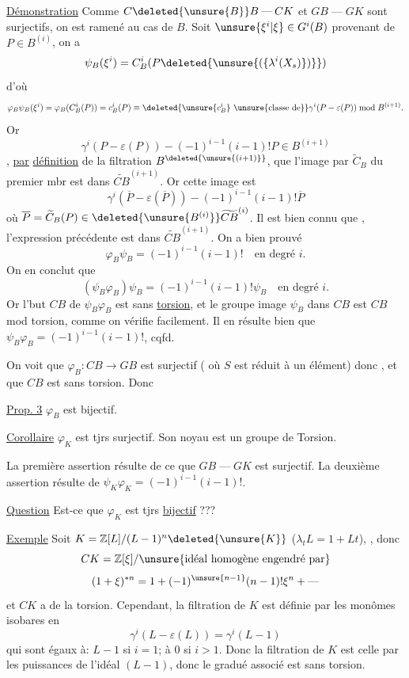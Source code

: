 \uline{Démonstration} Comme $C\deleted{\unsure{B}}B\mathbin{\text{---}}CK$ et $GB\mathbin{\text{---}}GK$ sont surjectifs, on est ramené au cas de $B$.
Soit $\unsure{\xi^i|\xi}\in G^i(B)$ provenant de $P\in B^{(i)}$, on a
\[
\psi_B(\xi^i)=C_B^i(P\deleted{\unsure{(\{\lambda^i(X_s)\})}})
\]
d'où
\[
\varphi_B\psi_B(\xi^i)=\varphi_B(C_B^i(P))=c_B^i(P)
\equiv\deleted{\unsure{c_B^i}\ \text{\unsure{classe de}}}\gamma^i(P-\varepsilon(P))\bmod B^{(i+1)}.
\]
Or 
\[
\gamma^i(P-\varepsilon(P))-(-1)^{i-1}(i-1)!P\in B^{(i+1)}
\]
, \uline{par} \uline{définition} de la filtration $B^{\deleted{\unsure{(i+1)}}}$, que l'image par $\widetilde C_B$ du premier mbr est dans $\widetilde{CB}^{(i+1)}$. Or cette image est
\[
\gamma^i(\overline P-\varepsilon(\overline P))-(-1)^{i-1}(i-1)!\overline P
\]
où $\overline P=\widetilde C_B(P)\in\deleted{\unsure{B^{(i)}}}\widetilde{CB}^{(i)}$.
Il est bien connu que , l'expression précédente est dans $\widetilde{CB}^{(i+1)}$. On a bien prouvé
\[
\varphi_B\psi_B=(-1)^{i-1}(i-1)!\quad\text{en degré }i.
\]
On en conclut que
\[
(\psi_B\varphi_B)\psi_B=(-1)^{i-1}(i-1)!\psi_B\quad\text{en degré }i.
\]
Or l'but $CB$ de $\psi_B\varphi_B$ est sans \uline{torsion}, et le groupe image  $\psi_B$ dans $CB$ est $CB$ mod torsion, comme on vérifie  facilement.
Il en résulte bien que $\psi_B\varphi_B=(-1)^{i-1}(i-1)!$, cqfd.

On voit que $\varphi_B:CB\longrightarrow GB$ est surjectif ( où $S$ est réduit à un élément) donc  , et que $CB$ est sans torsion. Donc

\uline{Prop. 3} $\varphi_B$ est bijectif.

\uline{Corollaire} $\varphi_K$ est tjrs surjectif. Son noyau est un groupe de Torsion.

La première assertion résulte de ce que $GB\mathbin{\text{---}}GK$ est surjectif. La deuxième assertion résulte de $\psi_K\varphi_K=(-1)^{i-1}(i-1)!$.

\uline{Question} Est-ce que $\varphi_K$ est tjrs \uline{bijectif} ??? 

\uline{Exemple} Soit  $K=\mathbb Z[L]/(L-1)^n\deleted{\unsure{K}}$ ($\lambda_t L=1+Lt$), , donc
\[
CK=\mathbb Z[\xi]/\text{\unsure{idéal homogène engendré par}}
\]
\[
(1+\xi)^{*n}=1+(-1)^{\unsure{n-1}}(n-1)!\xi^n+\text{---}
\]
et $CK$ a de la torsion. Cependant,  la filtration de $K$ est définie par les monômes isobares en
\[
\gamma^i(L-\varepsilon(L))=\gamma^i(L-1)
\]
qui sont  égaux à: $L-1$ si $i=1$; à $0$ si $i>1$. Donc la filtration de $K$ est celle par les puissances de l'idéal  $(L-1)$, donc le gradué associé est sans torsion.

